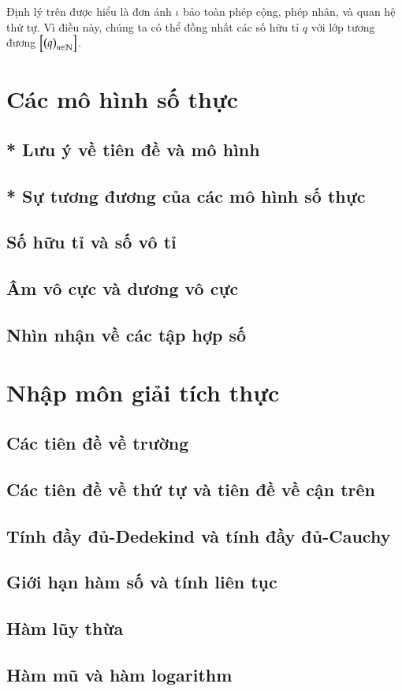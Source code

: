 Định lý trên được hiểu là đơn ánh $\iota$ bảo toàn phép cộng, phép nhân, và quan hệ thứ tự. Vì điều này, chúng ta có thể đồng nhất các số hữu tỉ $q$ với lớp tương đương $\left[{\left({q}\right)}_{{n}\in\mathbb{N}}\right]$.

\section{Các mô hình số thực}

\subsection{* Lưu ý về tiên đề và mô hình}

\subsection{* Sự tương đương của các mô hình số thực}

\subsection{Số hữu tỉ và số vô tỉ}

\subsection{Âm vô cực và dương vô cực}

\subsection{Nhìn nhận về các tập hợp số}

\section{Nhập môn giải tích thực}

\subsection{Các tiên đề về trường}

\subsection{Các tiên đề về thứ tự và tiên đề về cận trên}

\subsection{Tính đầy đủ-Dedekind và tính đầy đủ-Cauchy}

\subsection{Giới hạn hàm số và tính liên tục}

\subsection{Hàm lũy thừa}

\subsection{Hàm mũ và hàm logarithm}

